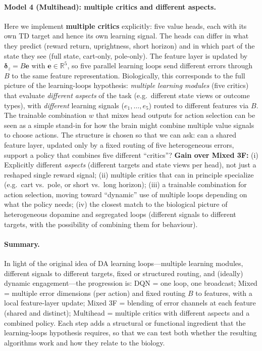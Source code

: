 \documentclass[11pt]{article}
\begin{document}
\paragraph{Model 4 (Multihead): multiple critics and different aspects.} Here we implement \textbf{multiple critics} explicitly: five value heads, each with its own TD target and hence its own learning signal. The heads can differ in what they predict (reward return, uprightness, short horizon) and in which part of the state they see (full state, cart-only, pole-only). The feature layer is updated by $\boldsymbol{\delta}_z = B\mathbf{e}$ with $\mathbf{e} \in \mathbb{R}^5$, so five parallel learning loops send different errors through $B$ to the same feature representation. Biologically, this corresponds to the full picture of the learning-loops hypothesis: \emph{multiple learning modules} (five critics) that evaluate \emph{different aspects} of the task (e.g.\ different state views or outcome types), with \emph{different} learning signals ($e_1,\ldots,e_5$) routed to different features via $B$. The trainable combination $w$ that mixes head outputs for action selection can be seen as a simple stand-in for how the brain might combine multiple value signals to choose actions. The structure is chosen so that we can ask: can a shared feature layer, updated only by a fixed routing of five heterogeneous errors, support a policy that combines five different ``critics''? \textbf{Gain over Mixed 3F:} (i) Explicitly different \emph{aspects} (different targets and state views per head), not just a reshaped single reward signal; (ii) multiple critics that can in principle specialize (e.g.\ cart vs.\ pole, or short vs.\ long horizon); (iii) a trainable combination for action selection, moving toward ``dynamic'' use of multiple loops depending on what the policy needs; (iv) the closest match to the biological picture of heterogeneous dopamine and segregated loops (different signals to different targets, with the possibility of combining them for behaviour).

\paragraph{Summary.} In light of the original idea of DA learning loops---multiple learning modules, different signals to different targets, fixed or structured routing, and (ideally) dynamic engagement---the progression is: DQN = one loop, one broadcast; Mixed = multiple error dimensions (per action) and fixed routing $B$ to features, with a local feature-layer update; Mixed 3F = blending of error channels at each feature (shared and distinct); Multihead = multiple critics with different aspects and a combined policy. Each step adds a structural or functional ingredient that the learning-loops hypothesis requires, so that we can test both whether the resulting algorithms work and how they relate to the biology.
\end{document}
